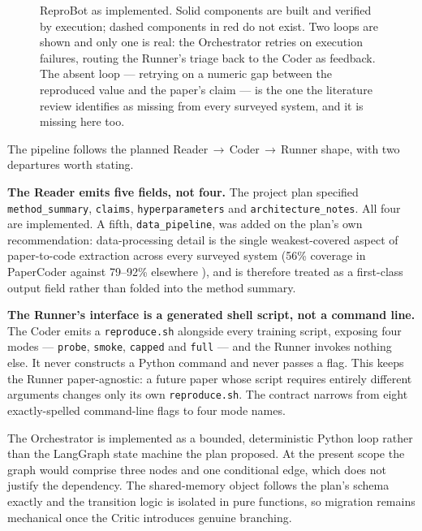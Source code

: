 \documentclass[11pt]{article}
\begin{document}
\begin{figure}[tbp]
\caption{ReproBot as implemented. Solid components are built and verified by execution;
dashed components in red do not exist. Two loops are shown and only one is real: the
Orchestrator retries on execution failures, routing the Runner's triage back to the Coder
as feedback. The absent loop --- retrying on a numeric gap between the reproduced value
and the paper's claim --- is the one the literature review identifies as missing from
every surveyed system, and it is missing here too.}
\label{fig:pipeline}
\end{figure}


The pipeline follows the planned Reader\,$\to$\,Coder\,$\to$\,Runner shape, with two
departures worth stating.

\textbf{The Reader emits five fields, not four.} The project plan specified
\texttt{method\_summary}, \texttt{claims}, \texttt{hyperparameters} and
\texttt{architecture\_notes}. All four are implemented. A fifth,
\texttt{data\_pipeline}, was added on the plan's own recommendation: data-processing
detail is the single weakest-covered aspect of paper-to-code extraction across every
surveyed system (56\% coverage in PaperCoder against 79--92\% elsewhere
\cite{seo2025papercoder}), and is therefore treated as a first-class output field rather
than folded into the method summary.

\textbf{The Runner's interface is a generated shell script, not a command line.} The
Coder emits a \texttt{reproduce.sh} alongside every training script, exposing four modes
--- \texttt{probe}, \texttt{smoke}, \texttt{capped} and \texttt{full} --- and the Runner
invokes nothing else. It never constructs a Python command and never passes a flag. This
keeps the Runner paper-agnostic: a future paper whose script requires entirely different
arguments changes only its own \texttt{reproduce.sh}. The contract narrows from eight
exactly-spelled command-line flags to four mode names.

The Orchestrator is implemented as a bounded, deterministic Python loop rather than the
LangGraph state machine the plan proposed. At the present scope the graph would comprise
three nodes and one conditional edge, which does not justify the dependency. The
shared-memory object follows the plan's schema exactly and the transition logic is
isolated in pure functions, so migration remains mechanical once the Critic introduces
genuine branching.
\end{document}
